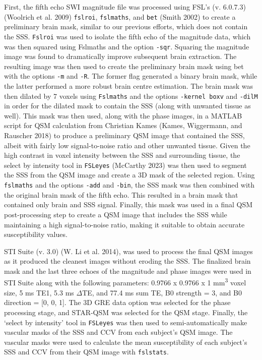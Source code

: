\documentclass[
sn-nature
]{sn-jnl}
\begin{document}
First, the fifth echo SWI magnitude file was processed using FSL's (v.
6.0.7.3) (Woolrich et al. 2009) \texttt{fslroi}, \texttt{fslmaths}, and
\texttt{bet} (Smith 2002) to create a preliminary brain mask, similar to
our previous efforts, which does not contain the SSS. \texttt{Fslroi}
was used to isolate the fifth echo of the magnitude data, which was then
squared using Fslmaths and the option \texttt{-sqr}. Squaring the
magnitude image was found to dramatically improve subsequent brain
extraction. The resulting image was then used to create the preliminary
brain mask using bet with the options \texttt{-m} and \texttt{-R}. The
former flag generated a binary brain mask, while the latter performed a
more robust brain centre estimation. The brain mask was then dilated by
7 voxels using \texttt{Fslmaths} and the options \texttt{-kernel\ boxv}
and \texttt{-dilM} in order for the dilated mask to contain the SSS
(along with unwanted tissue as well). This mask was then used, along
with the phase images, in a MATLAB script for QSM calculation from
Christian Kames (Kames, Wiggermann, and Rauscher 2018) to produce a
preliminary QSM image that contained the SSS, albeit with fairly low
signal-to-noise ratio and other unwanted tissue. Given the high contrast
in voxel intensity between the SSS and surrounding tissue, the select by
intensity tool in \texttt{FSLeyes} (McCarthy 2023) was then used to
segment the SSS from the QSM image and create a 3D mask of the selected
region. Using \texttt{fslmaths} and the options \texttt{-add} and
\texttt{-bin}, the SSS mask was then combined with the original brain
mask of the fifth echo. This resulted in a brain mask that contained
only brain and SSS signal. Finally, this mask was used in a final QSM
post-processing step to create a QSM image that includes the SSS while
maintaining a high signal-to-noise ratio, making it suitable to obtain
accurate susceptibility values.

STI Suite (v. 3.0) (W. Li et al. 2014), was used to process the final
QSM images as it produced the cleanest images without eroding the SSS.
The finalized brain mask and the last three echoes of the magnitude and
phase images were used in STI Suite along with the following parameters:
0.9766 x 0.9766 x 1 mm\textsuperscript{3} voxel size, 5 ms TE1, 5.3 ms
\(\Delta\)TE, and 77.4 ms sum TE, B0 strength = 3, and B0 direction =
{[}0, 0, 1{]}. The 3D GRE data option was selected for the phase
processing stage, and STAR-QSM was selected for the QSM stage. Finally,
the `select by intensity' tool in \texttt{FSLeyes} was then used to
semi-automatically make vascular masks of the SSS and CCV from each
subject's QSM image. The vascular masks were used to calculate the mean
susceptibility of each subject's SSS and CCV from their QSM image with
\texttt{fslstats}.
\end{document}
